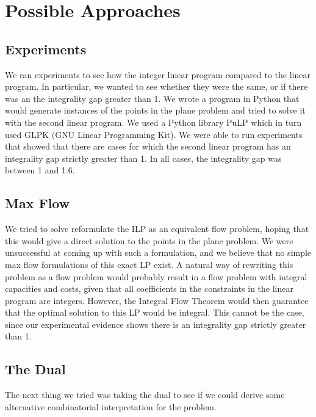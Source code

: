 \documentclass[11pt]{article}
\begin{document}
\section{Possible Approaches}

\subsection{Experiments}

We ran experiments to see how the integer linear program compared to the linear program. In particular, we wanted to see whether they were the same, or if there was an the integrality gap greater than 1. We wrote a program in Python that would generate instances of the points in the plane problem and tried to solve it with the second linear program. We used a Python library PuLP which in turn used GLPK (GNU Linear Programming Kit). We were able to run experiments that showed that there are cases for which the second linear program has an integrality gap strictly greater than 1. In all cases, the integrality gap was between 1 and 1.6.

\subsection{Max Flow}

We tried to solve reformulate the ILP as an equivalent flow problem, hoping that this would give a direct solution to the points in the plane problem. We were unsuccessful at coming up with such a formulation, and we believe that no simple max flow formulations of this exact LP exist. A natural way of rewriting this problem as a flow problem would probably result in a flow problem with integral capacities and costs, given that all coefficients in the constraints in the linear program are integers. However, the Integral Flow Theorem would then guarantee that the optimal solution to this LP would be integral. This cannot be the case, since our experimental evidence shows there is an integrality gap strictly greater than 1.

\subsection{The Dual}

The next thing we tried was taking the dual to see if we could derive some alternative combinatorial interpretation for the problem.
\end{document}
